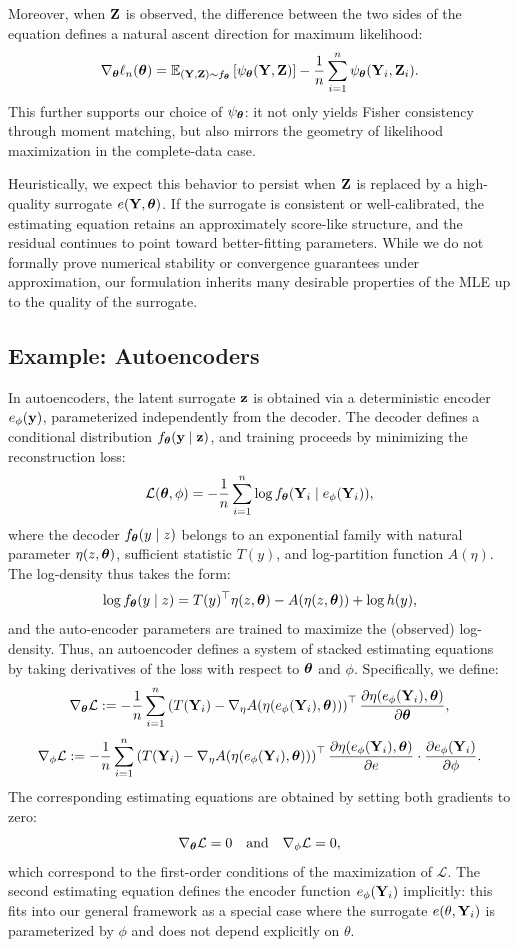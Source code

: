 \documentclass[twoside,11pt]{article}
\begin{document}
Moreover, when \({\bf Z}\) is observed, the difference between the two sides of the equation defines a natural ascent direction for maximum likelihood:
\[
\nabla_{\bm{\theta}} \ell_n({\bm{\theta}}) 
= 
\mathbb{E}_{({\bf Y}, {\bf Z}) \sim f_{\bm{\theta}}} \left[ \psi_{\bm{\theta}}({\bf Y}, {\bf Z}) \right] 
- 
\frac{1}{n} \sum_{i=1}^n \psi_{\bm{\theta}}({\bf Y}_i, {\bf Z}_i).
\]
This further supports our choice of \(\psi_{\bm{\theta}}\): it not only yields Fisher consistency through moment matching, but also mirrors the geometry of likelihood maximization in the complete-data case.

Heuristically, we expect this behavior to persist when \( {\bf Z} \) is replaced by a high-quality surrogate \( e({\bf Y}, {\bm{\theta}}) \). If the surrogate is consistent or well-calibrated, the estimating equation retains an approximately score-like structure, and the residual continues to point toward better-fitting parameters. While we do not formally prove numerical stability or convergence guarantees under approximation, our formulation inherits many desirable properties of the MLE up to the quality of the surrogate.

\subsection{Example: Autoencoders}

In autoencoders, the latent surrogate \( {\bf z} \) is obtained via a deterministic encoder \( e_\phi({\bf y}) \), parameterized independently from the decoder. The decoder defines a conditional distribution \( f_{\bm{\theta}}({\bf y} \mid {\bf z}) \), and training proceeds by minimizing the reconstruction loss:
\[
\mathcal{L}({\bm{\theta}}, \phi) = -\frac{1}{n} \sum_{i=1}^n \log f_{\bm{\theta}}({\bf Y}_i \mid e_\phi({\bf Y}_i)),
\]
where the decoder \( f_{\bm{\theta}}(y \mid z) \) belongs to an exponential family with natural parameter \( \eta(z, {\bm{\theta}}) \), sufficient statistic \( T(y) \), and log-partition function \( A(\eta) \). The log-density thus takes the form:
\[
\log f_{\bm{\theta}}(y \mid z) = T(y)^\top \eta(z, {\bm{\theta}}) - A(\eta(z, {\bm{\theta}})) + \log h(y),
\]
and the auto-encoder parameters are trained to maximize the (observed) log-density. Thus, an autoencoder defines a system of stacked estimating equations by taking derivatives of the loss with respect to \( {\bm{\theta}} \) and \( \phi \). Specifically, we define:
\[
\nabla_{\bm{\theta}} \mathcal{L} := -\frac{1}{n} \sum_{i=1}^n 
\left( T({\bf Y}_i) - \nabla_\eta A(\eta(e_\phi({\bf Y}_i), {\bm{\theta}})) \right)^\top 
\frac{\partial \eta(e_\phi({\bf Y}_i), {\bm{\theta}})}{\partial {\bm{\theta}}},
\]
\[
\nabla_\phi \mathcal{L} := -\frac{1}{n} \sum_{i=1}^n 
\left( T({\bf Y}_i) - \nabla_\eta A(\eta(e_\phi({\bf Y}_i), {\bm{\theta}})) \right)^\top 
\frac{\partial \eta(e_\phi({\bf Y}_i), {\bm{\theta}})}{\partial e} \cdot 
\frac{\partial e_\phi({\bf Y}_i)}{\partial \phi}.
\]
The corresponding estimating equations are obtained by setting both gradients to zero:
\[
\nabla_{\bm{\theta}} \mathcal{L} = 0 \quad \text{and} \quad \nabla_\phi \mathcal{L} = 0,
\]
which correspond to the first-order conditions of the maximization of $\mathcal L$. The second estimating equation defines the encoder function \( e_\phi({\bf Y}_i) \) implicitly: this fits into our general framework as a special case where the surrogate \( e(\theta, {\bf Y}_i) \) is parameterized by \( \phi \) and does not depend explicitly on \( \theta \).
\end{document}
